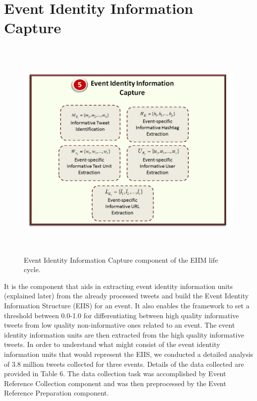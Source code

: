 \section{Event Identity Information Capture\label{infocapture}}

\begin{figure}[htbp]
  \caption{Event Identity Information Capture component of the EIIM life cycle.}
  \centering
    \includegraphics[width=14cm,height=11cm]{Figures/EIIMComponents/EventIdentityInformationCapture.jpg}
\end{figure}

It is the component that aids in extracting event identity information units (explained later) from the already processed tweets and build the Event Identity Information Structure (EIIS) for an event. It also enables the framework to set a threshold between 0.0-1.0 for differentiating between high quality informative tweets from low quality non-informative ones related to an event. The event identity information units are then extracted from the high quality informative tweets. 
In order to understand what might consist of the event identity information units that would represent the EIIS, we conducted a detailed analysis of 3.8 million tweets collected for three events. Details of the data collected are provided in Table 6. The data collection task was accomplished by Event Reference Collection component and was then preprocessed by the Event Reference Preparation component.

